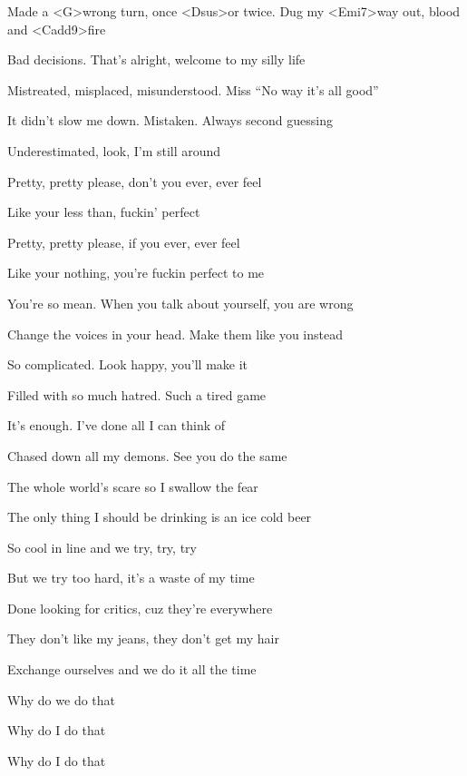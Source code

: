 

\zs
Made a <G>wrong turn, once <Dsus>or twice.
Dug my <Emi7>way out, blood and <Cadd9>fire

Bad decisions. That's alright, welcome to my silly life

Mistreated, misplaced, misunderstood. Miss ``No way it's all good''

It didn't slow me down. Mistaken. Always second guessing

Underestimated, look, I'm still around
\ks

\zr
Pretty, pretty please, don't you ever, ever feel

Like your less than, fuckin' perfect

Pretty, pretty please, if you ever, ever feel

Like your nothing, you're fuckin perfect to me
\kr

\zs
You're so mean. When you talk about yourself, you are wrong

Change the voices in your head. Make them like you instead

So complicated. Look happy, you'll make it

Filled with so much hatred. Such a tired game

It's enough. I've done all I can think of

Chased down all my demons. See you do the same
\ks

\zr
\kr

\zs
The whole world's scare so I swallow the fear

The only thing I should be drinking is an ice cold beer

So cool in line and we try, try, try

But we try too hard, it's a waste of my time

Done looking for critics, cuz they're everywhere

They don't like my jeans, they don't get my hair

Exchange ourselves and we do it all the time

Why do we do that

Why do I do that

Why do I do that
\ks

\zr \kr

\kp
